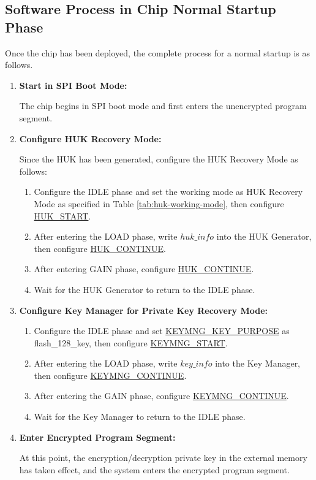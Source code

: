 \documentclass[main\_\_EN.tex]{subfiles}
\begin{document}
\subsection{Software Process in Chip Normal Startup Phase}
Once the chip has been deployed, the complete process for a normal startup is as follows.
\begin{enumerate}
    \item \textbf{Start in SPI Boot Mode:} 
    
    The chip begins in SPI boot mode and first enters the unencrypted program segment.

    \item \textbf{Configure HUK Recovery Mode:}
    
    Since the HUK has been generated, configure the HUK Recovery Mode as follows:
    \begin{enumerate}
        \item Configure the IDLE phase and set the working mode as HUK Recovery Mode as specified in Table \ref{tab:huk-working-mode}, then configure \hyperref[fielddesc:HUKSTART]{HUK\_START}.
        \item After entering the LOAD phase, write \hyperref[para:hukinfo]{\begin{math}huk\_info\end{math}} into the HUK Generator, then configure \hyperref[fielddesc:HUKCONTINUE]{HUK\_CONTINUE}.
        \item After entering GAIN phase, configure \hyperref[fielddesc:HUKCONTINUE]{HUK\_CONTINUE}.
        \item Wait for the HUK Generator to return to the IDLE phase.
    \end{enumerate}
    \item \textbf{Configure Key Manager for Private Key Recovery Mode:}
    \begin{enumerate}
        \item Configure the IDLE phase and set \hyperref[fielddesc:KEYMNGKEYPURPOSE]{KEYMNG\_KEY\_PURPOSE} as flash\_128\_key, then configure \hyperref[fielddesc:KEYMNGSTART]{KEYMNG\_START}.
        \item After entering the LOAD phase, write \hyperref[para:keyinfo]{\begin{math}key\_info\end{math}} into the Key Manager, then configure \hyperref[fielddesc:KEYMNGCONTINUE]{KEYMNG\_CONTINUE}.
        \item After entering the GAIN phase, configure \hyperref[fielddesc:KEYMNGCONTINUE]{KEYMNG\_CONTINUE}.
        \item Wait for the Key Manager to return to the IDLE phase.
    \end{enumerate}
    \item \textbf{Enter Encrypted Program Segment:}
    
    At this point, the encryption/decryption private key in the external memory has taken effect, and the system enters the encrypted program segment.
\end{enumerate}
\end{document}
